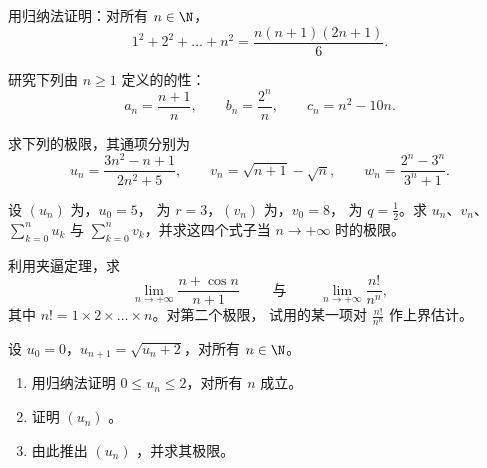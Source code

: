 \begin{exercise}[$\star$]\label{exo:g12:seq:1}
用归纳法证明：对所有 $n \in \N$，
\[
1^2 + 2^2 + \dots + n^2 = \frac{n(n+1)(2n+1)}{6}.
\]
\end{exercise}

\begin{exercise}[$\star$]\label{exo:g12:seq:2}
研究下列由 $n \geq 1$ 定义的的性：
\[
a_n = \frac{n+1}{n}, \qquad
b_n = \frac{2^n}{n}, \qquad
c_n = n^2 - 10n .
\]
\end{exercise}

\begin{exercise}[$\star$]\label{exo:g12:seq:3}
求下列的极限，其通项分别为
\[
u_n = \frac{3n^2 - n + 1}{2n^2 + 5}, \qquad
v_n = \sqrt{n+1} - \sqrt{n}, \qquad
w_n = \frac{2^n - 3^n}{3^n + 1}.
\]
\end{exercise}

\begin{exercise}[$\star$]\label{exo:g12:seq:4}
设 $(u_n)$ 为，$u_0 = 5$，
为 $r = 3$，$(v_n)$ 为，$v_0 = 8$，
为 $q = \frac{1}{2}$。求 $u_n$、$v_n$、$\sum_{k=0}^{n} u_k$ 与
$\sum_{k=0}^{n} v_k$，并求这四个式子当
$n \to +\infty$ 时的极限。
\end{exercise}

\begin{exercise}[$\star\star$]\label{exo:g12:seq:5}
利用夹逼定理，求
\[
\lim_{n\to+\infty} \frac{n + \cos n}{n + 1}
\qquad\text{ 与 }\qquad
\lim_{n\to+\infty} \frac{n!}{n^n},
\]
其中 $n! = 1 \times 2 \times \dots \times n$。对第二个极限，
试用的某一项对 $\frac{n!}{n^n}$ 作上界估计。
\end{exercise}

\begin{exercise}[$\star\star$]\label{exo:g12:seq:6}
设 $u_0 = 0$，$u_{n+1} = \sqrt{u_n + 2}$，对所有 $n \in \N$。
\begin{enumerate}
  \item 用归纳法证明 $0 \leq u_n \leq 2$，对所有 $n$ 成立。
  \item 证明 $(u_n)$ 。
  \item 由此推出 $(u_n)$ ，并求其极限。
\end{enumerate}
\end{exercise}

